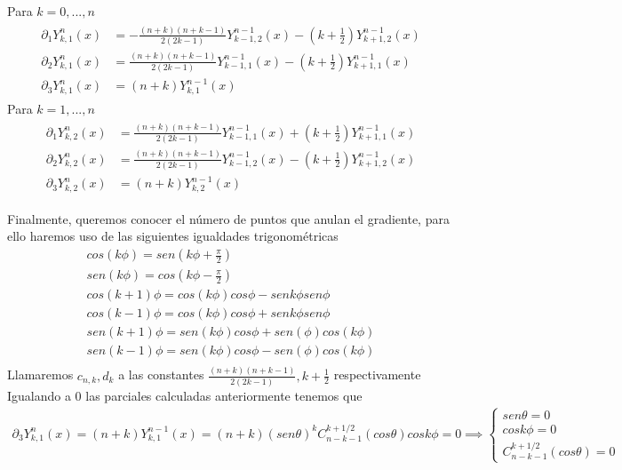\begin{prop} Para $k=0,...,n$
	\begin{gather*} 
		\begin{aligned}
			\partial_1Y^{n}_{k,1}(x) &= -\frac{(n+k)(n+k-1)}{2(2k-1)}Y^{n-1}_{k-1,2}(x)-(k+\frac{1}{2})Y^{n-1}_ {k+1,2}(x) \\
		\partial_2Y^{n}_{k,1}(x) &= \frac{(n+k)(n+k-1)}{2(2k-1)}Y^{n-1}_{k-1,1}(x)-(k+\frac{1}{2})Y^{n-1}_ {k+1,1}(x) \\
		\partial_3 Y_{k,1}^{n}(x) &=(n+k)Y_{k,1}^{n-1}(x)
			\end{aligned}
	\end{gather*}
 Para $k=1,...,n$
	\begin{gather*}
	\begin{aligned}
	\partial_1Y^{n}_{k,2}(x) &= \frac{(n+k)(n+k-1)}{2(2k-1)}Y^{n-1}_{k-1,1}(x)+(k+\frac{1}{2})Y^{n-1}_ {k+1,1}(x)\\
	\partial_2Y^{n}_{k,2}(x) &= \frac{(n+k)(n+k-1)}{2(2k-1)}Y^{n-1}_{k-1,2}(x)-(k+\frac{1}{2})Y^{n-1}_ {k+1,2}(x)\\
	\partial_3 Y_{k,2}^{n}(x) &=(n+k)Y_{k,2}^{n-1}(x)
		\end{aligned}
	\end{gather*}
\end{prop}
Finalmente, queremos conocer el número de puntos que anulan el gradiente, para ello haremos uso de las siguientes igualdades trigonométricas
\begin{gather}
cos(k\phi) = sen(k\phi + \frac{\pi}{2}) \\
sen (k\phi) = cos(k\phi - \frac{\pi}{2}) \\
cos(k+1)\phi= cos (k\phi)cos\phi - sen k\phi sen\phi \\
cos(k-1)\phi= cos (k\phi)cos\phi + sen k\phi sen\phi \\
sen(k+1)\phi = sen(k\phi)cos\phi + sen(\phi)cos(k\phi)\\
sen(k-1)\phi = sen(k\phi)cos\phi - sen(\phi)cos(k\phi)\\
\end{gather}
Llamaremos  $c_{n,k},d_k$ a las constantes $\frac{(n+k)(n+k-1)}{2(2k-1)},k+\frac{1}{2}$ respectivamente
Igualando a 0 las parciales calculadas anteriormente tenemos que
\begin{gather}
\partial_3 Y_{k,1}^n(x) = (n+k)Y_{k,1}^{n-1}(x) = (n+k)(sen \theta)^k C_{n-k-1}^{k+1/2}(cos \theta) cos k\phi = 0 \implies
\left\{
\begin{array}{ll}
sen \theta= 0 \\
cos k\phi = 0\\
C_{n-k-1}^{k+1/2}(cos \theta) = 0
\end{array}
\right.
\end{gather}

